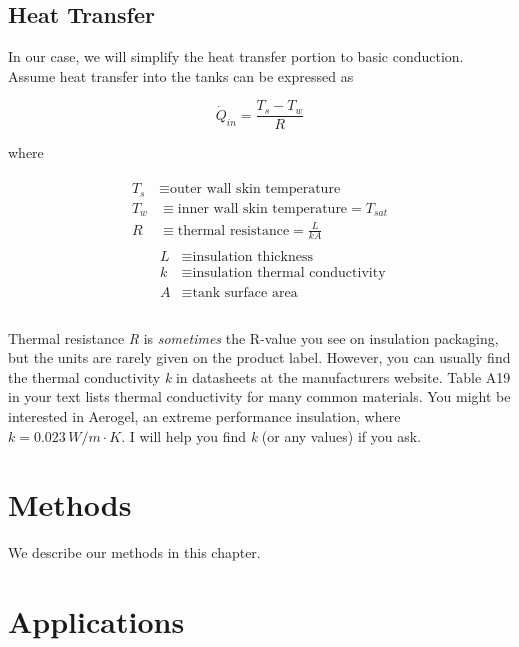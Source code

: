\documentclass[
]{book}
\begin{document}
\hypertarget{heat-transfer}{%
\section{Heat Transfer}\label{heat-transfer}}

\noindent
In our case, we will simplify the heat transfer portion to basic conduction. Assume heat transfer into the tanks can be expressed as

\begin{equation}
 \dot Q_{in} = \frac{T_s - T_w}{R}
\end{equation}

where

\begin{gather*}
  \begin{split}
    T_s &\equiv \text{outer wall skin temperature} \\
    T_w &\equiv \text{inner wall skin temperature} = T_{sat} \\
    R &\equiv   \text{thermal resistance} = \frac{L}{kA} 
  \end{split} \\
 \qquad
  \begin{split}
   L & \equiv \text{insulation thickness} \\
   k & \equiv \text{insulation thermal conductivity} \\
   A & \equiv \text{tank surface area} \\
  \end{split} \\ {}
\end{gather*}

Thermal resistance \emph{R} is \emph{sometimes} the R-value you see on insulation packaging, but the units are rarely given on the product label.
However, you can usually find the thermal conductivity \emph{k} in datasheets at the manufacturers website.
Table A19 in your text lists thermal conductivity for many common materials.
You might be interested in Aerogel, an extreme performance insulation, where
\(k = 0.023\, W/m \cdot K\).
I will help you find \emph{k} (or any values) if you ask.

\hypertarget{methods}{%
\chapter{Methods}\label{methods}}

We describe our methods in this chapter.

\hypertarget{applications}{%
\chapter{Applications}\label{applications}}
\end{document}
